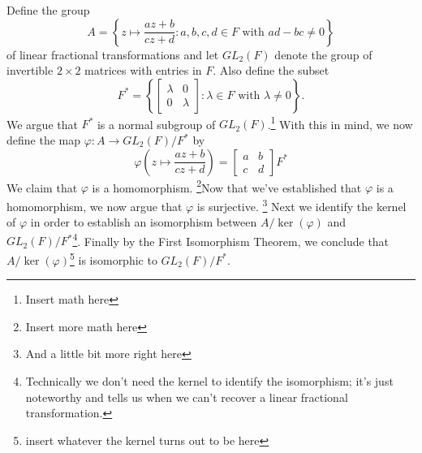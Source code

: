 \documentclass[12pt]{article}
\newcommand{\lftmat}[4]{\begin{bmatrix} {#1} & {#2} \\ {#3} & {#4} \end{bmatrix}}
\newcommand{\stanlftmat}{\lftmat{a}{b}{c}{d}}
\theoremstyle{plain}
\theoremstyle{definition}
\begin{document}
\noindent Define the group
	\[
		A = \left\lbrace z\mapsto \frac{az + b}{cz + d}\colon a,b,c,d\in F\text{ with } ad - bc \neq 0\right\rbrace
	\]
of linear fractional transformations and let $GL_2(F)$ denote the group of invertible $2\times 2$ matrices with entries in $F$. Also define the subset
	\[
		F^* = \left\lbrace\lftmat{\lambda}{0}{0}{\lambda}\colon \lambda\in F\text{ with } \lambda\neq 0 \right\rbrace.
	\]
	We argue that $F^*$ is a normal subgroup of $GL_2(F)$.\footnote{Insert math here} With this in mind, we now define the map $\varphi\colon A\rightarrow GL_2(F)/F^*$ by
	\[
		\varphi\left(z\mapsto \frac{az + b}{cz + d}\right) = \stanlftmat F^*
	\]
	We claim that $\varphi$ is a homomorphism. \footnote{Insert more math here}Now that we've established that $\varphi$ is a homomorphism, we now argue that $\varphi$ is surjective. \footnote{And a little bit more right here}  Next we identify the kernel of $\varphi$ in order to establish an isomorphism between $A/\ker(\varphi)$ and $GL_2(F)/F^*$\footnote{Technically we don't need the kernel to identify the isomorphism; it's just noteworthy and tells us when we can't recover a linear fractional transformation.}. Finally by the First Isomorphism Theorem, we conclude that $A/\ker(\varphi)$\footnote{insert whatever the kernel turns out to be here} is isomorphic to $GL_2(F)/F^*$. 
	
	
	



\newpage
{}

\end{document}
